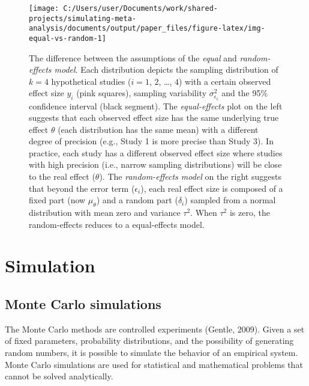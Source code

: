 \documentclass[
  man,floatsintext]{apa6}
\begin{document}
\begin{figure}[H]

{\centering \texttt{[image: C:/Users/user/Documents/work/shared-projects/simulating-meta-analysis/documents/output/paper\_files/figure-latex/img-equal-vs-random-1]} 

}

\caption{The difference between the assumptions of the \emph{equal} and \emph{random-effects model}. Each distribution depicts the sampling distribution of \(k = 4\) hypothetical studies (\(i = 1\), \(2\), \ldots, \(4\)) with a certain observed effect size \(y_{i}\) (pink squares), sampling variability \(\sigma_{\epsilon_i}^{2}\) and the 95\% confidence interval (black segment). The \emph{equal-effects} plot on the left suggests that each observed effect size has the same underlying true effect \(\theta\) (each distribution has the same mean) with a different degree of precision (e.g., Study 1 is more precise than Study 3). In practice, each study has a different observed effect size where studies with high precision (i.e., narrow sampling distributions) will be close to the real effect (\(\theta\)). The \emph{random-effects model} on the right suggests that beyond the error term (\(\epsilon_{i}\)), each real effect size is composed of a fixed part (now \(\mu_{\theta}\)) and a random part (\(\delta_{i}\)) sampled from a normal distribution with mean zero and variance \(\tau^{2}\). When \(\tau^{2}\) is zero, the random-effects reduces to a equal-effects model.}\label{fig:img-equal-vs-random}
\end{figure}

\normalsize

\section{Simulation}\label{simulation}

\subsection{Monte Carlo simulations}\label{monte-carlo-simulations}

The Monte Carlo methods are controlled experiments (Gentle, 2009). Given a set of fixed parameters, probability distributions, and the possibility of generating random numbers, it is possible to simulate the behavior of an empirical system. Monte Carlo simulations are used for statistical and mathematical problems that cannot be solved analytically.
\end{document}
